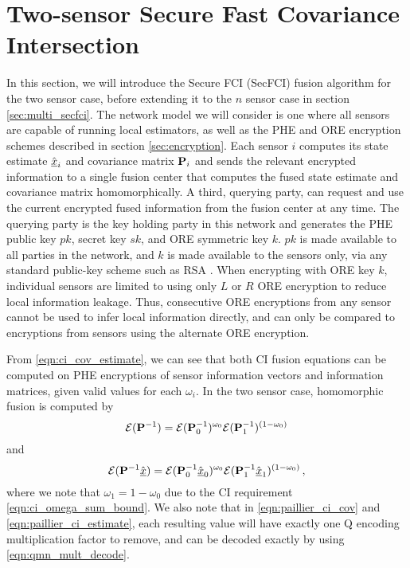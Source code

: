 \documentclass[letterpaper, 10 pt, conference]{ieeeconf}  %
\begin{document}
\section{Two-sensor Secure Fast Covariance Intersection} \label{sec:secfci}
In this section, we will introduce the Secure FCI (SecFCI) fusion algorithm for the two sensor case, before extending it to the $n$ sensor case in section \ref{sec:multi_secfci}. The network model we will consider is one where all sensors are capable of running local estimators, as well as the PHE and ORE encryption schemes described in section \ref{sec:encryption}. Each sensor $i$ computes its state estimate $\hat{{\underline{x}}}_i$ and covariance matrix ${{\mathbf{P}}}_i$ and sends the relevant encrypted information to a single fusion center that computes the fused state estimate and covariance matrix homomorphically. A third, querying party, can request and use the current encrypted fused information from the fusion center at any time. The querying party is the key holding party in this network and generates the PHE public key $pk$, secret key $sk$, and ORE symmetric key $k$. $pk$ is made available to all parties in the network, and $k$ is made available to the sensors only, via any standard public-key scheme such as RSA \cite{rivestMethodObtainingDigital1978}. When encrypting with ORE key $k$, individual sensors are limited to using only $L$ or $R$ ORE encryption to reduce local information leakage. Thus, consecutive ORE encryptions from any sensor cannot be used to infer local information directly, and can only be compared to encryptions from sensors using the alternate ORE encryption.

From \eqref{eqn:ci_cov_estimate}, we can see that both CI fusion equations can be computed on PHE encryptions of sensor information vectors and information matrices, given valid values for each $\omega_i$. In the two sensor case, homomorphic fusion is computed by
\begin{equation}
   \mathcal{E}({{\mathbf{P}}}^{-1}) = \mathcal{E}({{\mathbf{P}}}^{-1}_0)^{\omega_0}\mathcal{E}({{\mathbf{P}}}^{-1}_1)^{(1 -\omega_0)} \label{eqn:paillier_ci_cov}
\end{equation}
and
\begin{equation}
   \mathcal{E}({{\mathbf{P}}}^{-1}\hat{{\underline{x}}}) = \mathcal{E}({{\mathbf{P}}}^{-1}_0\hat{{\underline{x}}}_0)^{\omega_0}\mathcal{E}({{\mathbf{P}}}^{-1}_1\hat{{\underline{x}}}_1)^{(1 - \omega_0)}\,, \label{eqn:paillier_ci_estimate}
\end{equation}
where we note that $\omega_1=1-\omega_0$ due to the CI requirement \eqref{eqn:ci_omega_sum_bound}. We also note that in \eqref{eqn:paillier_ci_cov} and \eqref{eqn:paillier_ci_estimate}, each resulting value will have exactly one Q encoding multiplication factor to remove, and can be decoded exactly by using \eqref{eqn:qmn_mult_decode}.
\end{document}

